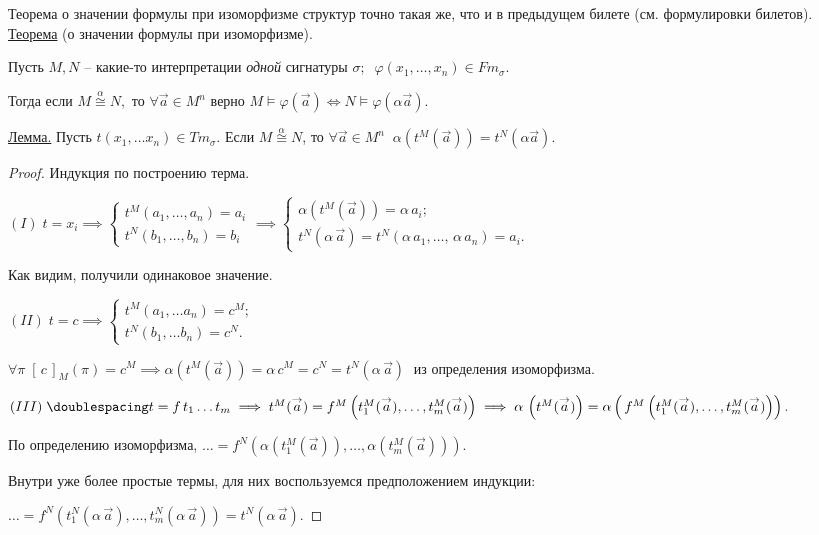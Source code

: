 \documentclass[a4paper, fleqn]{article}
\begin{document}
    Теорема о значении формулы при изоморфизме структур точно такая же, что и в предыдущем билете (см. формулировки билетов). \\
    \underline{Теорема} (о значении формулы при изоморфизме). 
    
    Пусть $M, N$ -- какие-то интерпретации \textit{одной} сигнатуры $\sigma; \; \; \varphi(x_1, \dots, x_n) \in Fm_\sigma.$
    
    Тогда если $M \overset{\alpha}{\cong} N,$ то $\forall \overset{\to}{a} \in M^n $ верно  $M \vDash \varphi (\overset{\to}{a}) \iff N \vDash \varphi (\alpha \overset{\to}{a}).$
    
    \underline{Лемма.} Пусть $t(x_1, \dots x_n) \in Tm_\sigma.$ Если $M \overset{\alpha}{\cong} N$, то $\forall \overset{\to}{a} \in M^n \; \; \alpha (t^M (\overset{\to}{a})) = t^N (\alpha \overset{\to}{a}).$
    
    \begin{proof} Индукция по построению терма.
    
    \onehalfspacing $(I) \;  t = x_i \implies \begin{cases} t^M (a_1, \dots,  a_n) = a_i \\ t^N (b_1, \dots,  b_n) = b_i  \end{cases} \implies
    \begin{cases}
    \alpha (t^M (\overset{\to}{a})) = \alpha  \, a_i; \\
    t^N (\alpha \, \overset{\to}{a}) = t^N(\alpha \, a_1, \dots, \, \alpha \, a_n) = a_i.
    \end{cases}$
    
    Как видим, получили одинаковое значение.
    
    $(II) \; t = c \implies
    \begin{cases}
    t^M (a_1, \dots a_n) = c^M;\\
    t^N (b_1, \dots b _n) = c^N.
    \end{cases} $
    
    $ \forall \pi \; [\, c \, ]_M (\pi) = c^M  \implies
    \alpha (t^M(\overset{\to}{a})) = \alpha \, c^M = c^N = t^N (\alpha \, \overset{\to}{a})\;$ из определения изоморфизма.
    
    $(III) \;\doublespacing  t = f \, t_1 \dots  t_m \implies
    t^M(\overset{\to}{a}) = f^M \left(t_1^M(\overset{\to}{a})   , \dots, t_m^M(\overset{\to}{a}) \right) \implies
    \alpha \,\left( t^M(\overset{\to}{a})\right) = \alpha \left(\, f^M \left(t_1^M(\overset{\to}{a})   , \dots, t_m^M(\overset{\to}{a}) \right) \right).
     $ 
    
    По определению изоморфизма,  $\dots =  f^N \left( \alpha \left(t_1^M(\overset{\to}{a})\right)   , \dots,  \alpha \left(t_m^M(\overset{\to}{a}) \right) \right).$ 
    
    Внутри уже более простые термы, для них воспользуемся предположением индукции:
    
    $\dots =   f^N \left(  t_1^N(\alpha \, \overset{\to}{a})   , \dots, t_m^N( \alpha \, \overset{\to}{a})  \right) = t^N(\alpha \, \overset{\to}{a}).$
    
    \end{proof}
        
\end{document}
